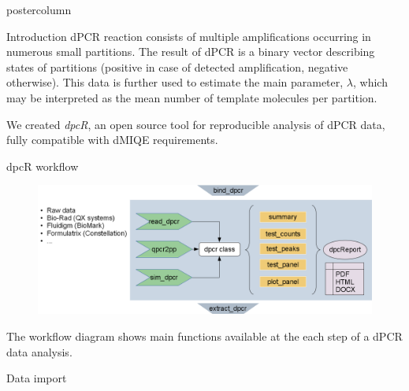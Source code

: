 \documentclass[final]{beamer}\usepackage[]{graphicx}\usepackage[]{color}
\newlength{\columnheight}
\begin{document}
\begin{frame}
  \begin{columns}
    \begin{column}{.46\textwidth}
      \begin{beamercolorbox}[center,wd=\textwidth]{postercolumn}
        \begin{minipage}[T]{.95\textwidth}
          \parbox[t][\columnheight]{\textwidth}
            {
    
        
    \begin{block}{Introduction}
      dPCR reaction consists of multiple amplifications occurring in numerous small partitions. The result of dPCR is a binary vector describing states of partitions (positive in case of detected amplification, negative otherwise). This data is further used to estimate the main parameter, $\lambda$, which may be interpreted as the mean number of template molecules per partition.
      
      \medskip
      
      We created \textit{dpcR}, an open source tool for reproducible analysis of dPCR data, fully compatible with dMIQE requirements.
    \end{block}
    
    \vfill
    
    \begin{block}{dpcR workflow}

      \begin{figure}
\begin{center}
\includegraphics{dpcR_figures/dpcR_framework.png}
\end{center}
\label{workflow}
\end{figure}

The workflow diagram shows main functions available at the each step of a dPCR data analysis.

    \end{block}
    \vfill
    
    
    \begin{block}{Data import}


\end{block}}
\end{minipage}
\end{beamercolorbox}
\end{column}
\end{columns}
\end{frame}
\end{document}
